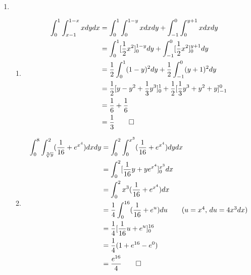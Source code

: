 \documentclass[12pt, a4paper]{article}
\begin{document}
\begin{enumerate}[Q\arabic*.]
  \item 
    \begin{enumerate}[(\alph*)]
      \item \begin{align*}
          \int^1_0\int^{1-x}_{x-1}x dydx &= \int^1_0\int^{1-y}_0 x dxdy + \int^0_{-1}\int^{y+1}_0 x dxdy\\
                                         &= \int^1_0[\frac{1}{2}x^2]^{1-y}_0 dy + \int^0_{-1}[\frac{1}{2}x^2]^{y+1}_0dy\\
                                         &= \frac{1}{2}\int^1_0 (1-y)^2 dy + \frac{1}{2}\int^0_{-1}(y+1)^2 dy\\
                                         &= \frac{1}{2}[y-y^2+\frac{1}{3}y^3]^1_0 + \frac{1}{2}[\frac{1}{3}y^3+y^2+y]^0_{-1}\\
                                         &= \frac{1}{6} + \frac{1}{6}\\
                                         &= \frac{1}{3} \qed
        \end{align*}
 
      \item 
        \begin{align*}
          \int^8_0 \int^2_{\sqrt[3]{y}}(\frac{1}{16} + e^{x^4})dxdy &= \int^2_0\int^{x^3}_0(\frac{1}{16}+e^{x^4})dydx\\
                                                                    &= \int^2_0[\frac{1}{16}y+ye^{x^4}]^{x^3}_0 dx\\
                                                                    &= \int^2_0 x^3(\frac{1}{16}+e^{x^4})dx\\
                                                                    &= \frac{1}{4}\int^{16}_0(\frac{1}{16}+e^u)du\tag*{($u=x^4$, $du=4x^3dx$)}\\
                                                                    &= \frac{1}{4}[\frac{1}{16}u+e^u]^{16}_0\\
                                                                    &= \frac{1}{4}(1+e^{16}-e^0)\\
                                                                    &= \frac{e^{16}}{4}\qed
        \end{align*}
    \end{enumerate}
    \pagebreak


\end{enumerate}
\end{document}
